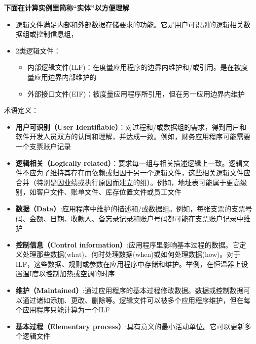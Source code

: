 \documentclass{book}        %
\providecommand{\tightlist}{%
  \setlength{\itemsep}{0pt}\setlength{\parskip}{0pt}}
\begin{document}
\textbf{下面在计算实例里简称``实体''以方便理解}

\begin{itemize}
\tightlist
\item
  逻辑文件满足内部和外部数据存储要求的功能。它是用户可识别的逻辑相关数据组或控制信息组，
\item
  2类逻辑文件：

  \begin{itemize}
  \tightlist
  \item
    内部逻辑文件(ILF)：在度量应用程序的边界内维护和/或引用。是在被度量应用边界内部维护的
  \item
    外部接口文件(EIF)：被度量应用程序所引用，但在另一应用边界内维护
  \end{itemize}
\end{itemize}

术语定义：

\begin{itemize}
\tightlist
\item
  \textbf{用户可识别（User
  Identifiable）}：对过程和/或数据组的需求，得到用户和软件开发人员双方的认同和理解，并达成一致。例如，财务应用程序可能需要一个支票账户记录\\
\item
  \textbf{逻辑相关（Logically
  related）}：要求每一组与相关描述逻辑上一致。逻辑文件不应为了维持其存在而依赖或归因于另一个逻辑文件，这些相关逻辑文件应合并（特别是因业绩或执行原因而建立的组）。例如，地址表可能属于更高级别，如客户文件、账单文件、库存位置文件或员工文件\\
\item
  \textbf{数据（Data）}:应用程序中维护的描述和/或数据组。例如，每张支票的支票号码、金额、日期、收款人、备忘录记录和账户号码都可能在支票账户记录中维护\\
\item
  \textbf{控制信息（Control
  information）}:应用程序里影响基本过程的数据。它定义处理那些数据(what)、何时处理数据(when)或如何处理数据(how)。对于ILF，这些数据、规则或参数在应用程序中存储和维护。举例，在恒温器上设置温I度以控制加热或空调的时序\\
\item
  \textbf{维护（Maintained）}:通过应用程序的基本过程修改数据。数据或控制数据可以通过诸如添加、更改、删除等。逻辑文件可以被多个应用程序维护，但在每个应用程序只能计算为一个ILF\\
\item
  \textbf{基本过程（Elementary
  process）}:具有意义的最小活动单位。它可以更新多个逻辑文件\\
\end{itemize}
\end{document}
